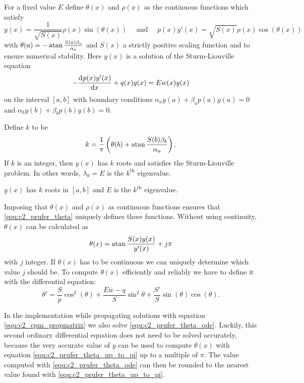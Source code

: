 \begin{theorem}[Prüfer 1926]
    For a fixed value $E$ define $\theta(x)$ and $\rho(x)$ as the continuous functions which satisfy
    \begin{equation}\label{equ:c2_prufer_theta}
        y(x) = \frac{1}{\sqrt{S(x)}} \rho(x) \sin(\theta(x)) \quad\text{ and }\quad p(x)y'(x) = \sqrt{S(x)} \rho(x) \cos(\theta(x))
    \end{equation}
    with $\theta(a) = -\atan\frac{S(a)\beta_a}{\alpha_a}$ and $S(x)$ a strictly positive scaling function and to ensure numerical stability.
    Here $y(x)$ is a solution of the Sturm-Liouville equation
    $$
        -\dv[]{p(x)y'(x)}{x} + q(x) y(x) = E w(x) y(x)
    $$
    on the interval $[a, b]$ with boundary conditions $\alpha_a y(a) + \beta_a p(a) y(a) = 0$ and $\alpha_b y(b) + \beta_b p(b) y(b) = 0$.

    Define $k$ to be
    $$
        k = \frac{1}{\pi}\left(\theta(b) + \atan\frac{S(b)\beta_b}{\alpha_a}\right) \text{.}
    $$
    If $k$ is an integer, then $y(x)$ has $k$ roots and satisfies the Sturm-Liouville problem. In other words, $\lambda_k = E$ is the $k^\text{th}$ eigenvalue.

    $y(x)$ has $k$ roots in $[a, b]$ and $E$ is the $k^\text{th}$ eigenvalue.
\end{theorem}

Imposing that $\theta(x)$ and $\rho(x)$ as continuous functions ensures that \eqref{equ:c2_prufer_theta} uniquely defines these functions. Without using continuity, $\theta(x)$ can be calculated as
\begin{equation}\label{equ:c2_prufer_theta_up_to_pi}
    \theta(x) = \atan\frac{S(x)y(x)}{y'(x)} + j\pi
\end{equation}
with $j$ integer. If $\theta(x)$ has to be continuous we can uniquely determine which value $j$ should be. To compute $\theta(x)$ efficiently and reliably we have to define it with the differential equation:
\begin{equation}\label{equ:c2_prufer_theta_ode}
    \theta' = \frac{S}{p} \cos^2(\theta) + \frac{Ew - q}{S}\sin^2\theta + \frac{S'}{S}\sin(\theta)\cos(\theta)\text{.}
\end{equation}


In the implementation while propagating solutions with equation \eqref{equ:c2_cpm_propmatrix} we also solve \eqref{equ:c2_prufer_theta_ode}. Luckily, this second ordinary differential equation does not need to be solved accurately, because the very accurate value of $y$ can be used to compute $\theta(x)$ with equation \eqref{equ:c2_prufer_theta_up_to_pi} up to a multiple of $\pi$. The value computed with \eqref{equ:c2_prufer_theta_ode} can then be rounded to the nearest value found with \eqref{equ:c2_prufer_theta_up_to_pi}.

